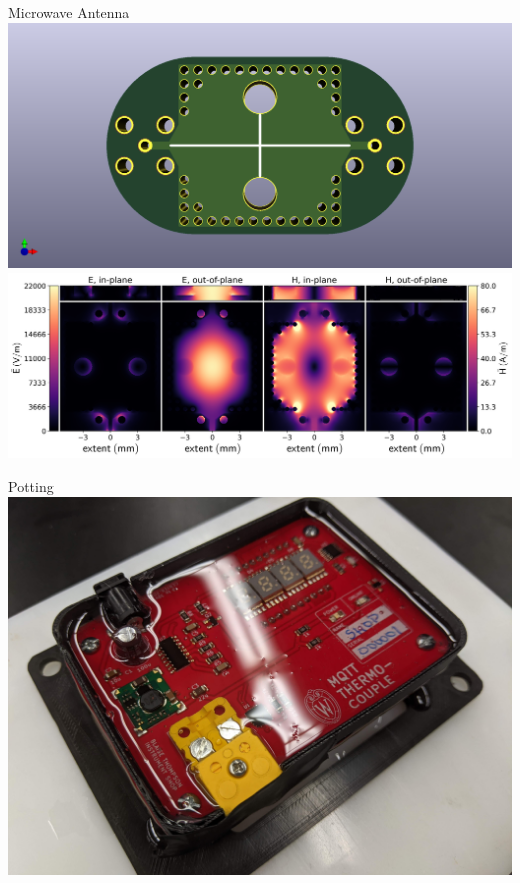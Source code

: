 \documentclass{presentation}
\begin{document}
\begin{frame}{Microwave Antenna}
  \centering
  \includegraphics[width=\textwidth/2]{"./darien/SIW_KiCAD_top.png"}
  \includegraphics[width=\textwidth]{"./darien/SIW_fields.png"}
\end{frame}

\begin{frame}{Potting}
  \centering
  \includegraphics[width=\textwidth*3/4]{"./potting.jpg"}
\end{frame}
\end{document}
